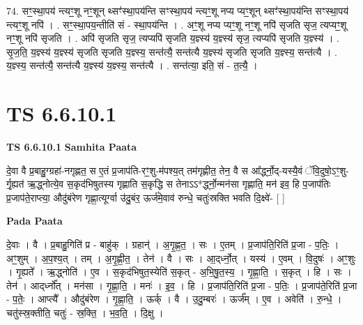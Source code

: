 \documentclass[17pt]{extarticle}
\begin{document}
74. सꣳ॒॒स्था॒पय॑ न्त्यꣳ॒॒शू नꣳ॒॒शून् थ्सꣳ॑स्था॒पय॑न्ति सꣳस्था॒पय॑ न्त्यꣳ॒॒शू नप्य प्यꣳ॒॒शून् थ्सꣳ॑स्था॒पय॑न्ति सꣳस्था॒पय॑ न्त्यꣳ॒॒शू नपि॑ । . सꣳ॒॒स्था॒पय॒न्तीति॑ सं - स्था॒पय॑न्ति । . अꣳ॒॒शू नप्य प्यꣳ॒॒शू नꣳ॒॒शू नपि॑ सृजति सृज॒ त्यप्यꣳ॒॒शू नꣳ॒॒शू नपि॑ सृजति । . अपि॑ सृजति सृज॒ त्यप्यपि॑ सृजति य॒ज्ञ्स्य॑ य॒ज्ञ्स्य॑ सृज॒ त्यप्यपि॑ सृजति य॒ज्ञ्स्य॑ । . सृ॒ज॒ति॒ य॒ज्ञ्स्य॑ य॒ज्ञ्स्य॑ सृजति सृजति य॒ज्ञ्स्य॒ सन्त॑त्यै॒ सन्त॑त्यै य॒ज्ञ्स्य॑ सृजति सृजति य॒ज्ञ्स्य॒ सन्त॑त्यै । . य॒ज्ञ्स्य॒ सन्त॑त्यै॒ सन्त॑त्यै य॒ज्ञ्स्य॑ य॒ज्ञ्स्य॒ सन्त॑त्यै । . सन्त॑त्या॒ इति॒ सं - त॒त्यै॒ । \newline
\pagebreak
{}

\section{ TS 6.6.10.1 }

\textbf{TS 6.6.10.1 } \newline
\textbf{Samhita Paata} \newline

दे॒वा वै प्र॒बाहु॒ग्ग्रहा॑-नगृह्णत॒ स ए॒तं प्र॒जाप॑ति-रꣳ॒॒शु-म॑पश्य॒त् तम॑गृह्णीत॒ तेन॒ वै स आ᳚र्द्ध्नो॒द्-यस्यै॒वं ॅवि॒दुषो॒ऽꣳ॒शु-र्गृ॒ह्यत॑ ऋ॒द्ध्नोत्ये॒व स॒कृद॑भिषुतस्य गृह्णाति स॒कृद्धि स तेनाऽऽ*र्द्ध्नो॒न्मन॑सा गृह्णाति॒ मन॑ इव॒ हि प॒जाप॑तिः प्र॒जाप॑ते॒राप्त्या॒ औदु॑बंरेण गृह्णा॒त्यूर्ग्वा उ॑दु॒बंर॒ ऊर्ज॑मे॒वाव॑ रुन्धे॒ चतुः॑स्रक्ति भवति दि॒क्ष्वे॑- [  ] \newline

\textbf{Pada Paata} \newline

दे॒वाः । वै । प्र॒बाहु॒गिति॑ प्र - बाहु॑क् । ग्रहान्॑ । अ॒गृ॒ह्ण॒त॒ । सः । ए॒तम् । प्र॒जाप॑ति॒रिति॑ प्र॒जा - प॒तिः॒ । अꣳ॒॒शुम् । अ॒प॒श्य॒त् । तम् । अ॒गृ॒ह्णी॒त॒ । तेन॑ । वै । सः । आ॒द्‌र्ध्नो॒त् । यस्य॑ । ए॒वम् । वि॒दुषः॑ । अꣳ॒॒शुः । गृ॒ह्यते᳚ । ऋ॒द्ध्नोति॑ । ए॒व । स॒कृद॑भिषुत॒स्येति॑ स॒कृत् - अ॒भि॒षु॒त॒स्य॒ । गृ॒ह्णा॒ति॒ । स॒कृत् । हि । सः । तेन॑ । आद्‌र्ध्नो᳚त् । मन॑सा । गृ॒ह्णा॒ति॒ । मनः॑ । इ॒व॒ । हि । प्र॒जाप॑ति॒रिति॑ प्र॒जा - प॒तिः॒ । प्र॒जाप॑ते॒रिति॑ प्र॒जा - प॒तेः॒ । आप्त्यै᳚ । औदु॑बंरेण । गृ॒ह्णा॒ति॒ । ऊर्क् । वै । उ॒दु॒म्बरः॑ । ऊर्ज᳚म् । ए॒व । अवेति॑ । रु॒न्धे॒ । चतु॑स्स्र॒क्तीति॒ चतुः॑ - स्र॒क्ति॒ । भ॒व॒ति॒ । दि॒क्षु ।  \newline
\end{document}
